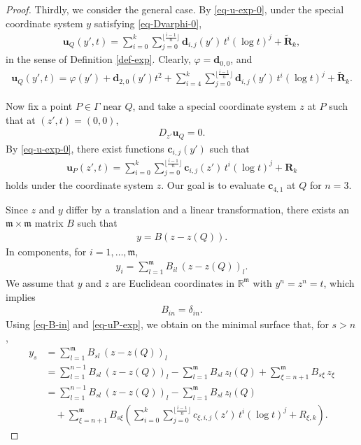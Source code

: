 \documentclass[10pt,a4paper]{amsart}
\newcommand{\fm}{\mathfrak{m}}
\begin{document}
\begin{proof}
Thirdly, we consider the general case. By \eqref{eq-u-exp-0}, under the special coordinate system $y$ satisfying \eqref{eq-Dvarphi-0},
\begin{align}\label{eq-uQ-y}
    \mathbf u_Q(y', t) = \sum_{i=0}^k\sum_{j=0}^{\lfloor \frac{i-1}{n}\rfloor} \mathbf{d}_{i,j}(y')\, t^i (\log t)^j + \tilde{\mathbf R}_k,
\end{align}
in the sense of Definition \ref{def-exp}. Clearly, $\varphi = \mathbf d_{0,0}$, and
\begin{align}\label{eq-uQ-y-2}
    \mathbf u_Q(y', t) = \varphi(y') + \mathbf{d}_{2,0}(y')t^2 + \sum_{i=4}^k\sum_{j=0}^{\lfloor \frac{i-1}{n}\rfloor} \mathbf{d}_{i,j}(y')\, t^i (\log t)^j + \tilde{\mathbf R}_k.
\end{align}

Now fix a point $P\in \Gamma$ near $Q$, and take a special coordinate system $z$ at $P$ such that at $(z', t) = (0, 0)$,
\begin{align}
    D_{z'} \mathbf u_Q = 0.
\end{align}
By \eqref{eq-u-exp-0}, there exist functions $\mathbf c_{i,j}(y')$ such that
\begin{align}\label{eq-uP-exp}
    \mathbf u_P(z', t) = \sum_{i=0}^k\sum_{j=0}^{\lfloor \frac{i-1}{n}\rfloor} \mathbf{c}_{i,j}(z')\, t^i (\log t)^j + \mathbf R_k
\end{align}
holds under the coordinate system $z$. Our goal is to evaluate $\mathbf c_{4,1}$ at $Q$ for $n=3$.

Since $z$ and $y$ differ by a translation and a linear transformation, there exists an $\fm\times \fm$ matrix $B$ such that
\begin{align}
    y = B(z - z(Q)).
\end{align}
In components, for $i=1,\dots,\fm$,
\begin{align}
    y_i = \sum_{l=1}^\fm B_{il}\,(z-z(Q))_l.
\end{align}
We assume that $y$ and $z$ are Euclidean coordinates in $\mathbb{R}^\fm$ with $y^n=z^n=t$, which implies
\begin{align}\label{eq-B-in}
    B_{in} = \delta_{in}.
\end{align}
Using \eqref{eq-B-in} and \eqref{eq-uP-exp}, we obtain on the minimal surface that, for $s>n$,
\begin{align}
y_s &= \sum_{l=1}^\fm B_{sl}\,(z-z(Q))_l \nonumber\\
&= \sum_{l=1}^{n-1} B_{sl}\,(z-z(Q))_l - \sum_{l=1}^\fm B_{sl}\,z_l(Q) + \sum_{\xi=n+1}^\fm B_{s\xi}\,z_\xi \nonumber\\
&= \sum_{l=1}^{n-1} B_{sl}\,(z-z(Q))_l - \sum_{l=1}^\fm B_{sl}\,z_l(Q) \nonumber\\
&\quad + \sum_{\xi=n+1}^\fm B_{s\xi} \left( \sum_{i=0}^k\sum_{j=0}^{\lfloor \frac{i-1}{n}\rfloor} c_{\xi,i,j}(z')\, t^i (\log t)^j + R_{\xi,k} \right). \label{eq-uQ-z}
\end{align}


\end{proof}
\end{document}
